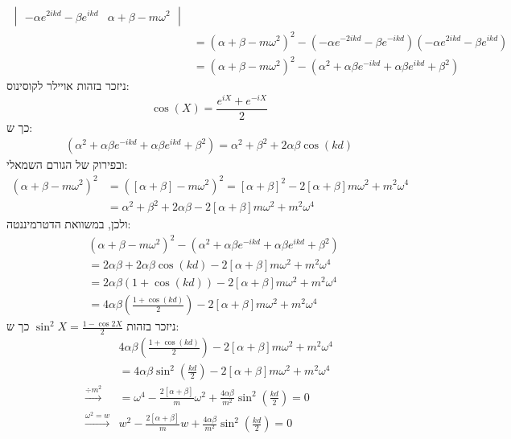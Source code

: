 \documentclass{article}
\begin{document}
\begin{Answer}
\begin{align*}
\begin{vmatrix}
        -\alpha e^{2ikd}-\beta e^{ikd}&\alpha+\beta-m\omega^2 
    \end{vmatrix}\\
    &=\left( \alpha+\beta-m\omega^2 \right)^{2}-\left( -\alpha e^{-2ikd}-\beta e^{-ikd} \right)\left( -\alpha e^{2ikd}-\beta e^{ikd} \right)\\
    &= \left( \alpha+\beta-m\omega^2 \right)^{2} - \left( \alpha^2+\alpha\beta e^{-ikd} +\alpha\beta e^{ikd} +\beta^2\right)
\end{align*}
ניזכר בזהות אויילר לקוסינוס:
$$\cos(X)=\frac{e^{iX}+e^{-iX}}{2}$$
כך ש:
\begin{align*}
    \left( \alpha^2+\alpha\beta e^{-ikd} +\alpha\beta e^{ikd} +\beta^2\right)=\alpha^{2}+\beta^{2}+2\alpha\beta\cos(kd)
\end{align*}
ובפירוק של הגורם השמאלי:
\begin{align*}
    \left( \alpha+\beta-m\omega^2 \right)^{2}&= \left( \left[ \alpha+\beta \right]-m\omega^2 \right)^{2}=\left[ \alpha+\beta \right]^{2}-2\left[ \alpha+\beta \right]m\omega^2+m^{2}\omega^{4}\\
    &=\alpha^{2}+\beta^{2}+2\alpha\beta-2\left[ \alpha+\beta \right]m\omega^2+m^{2}\omega^{4}
\end{align*}
ולכן, במשוואת הדטרמיננטה:
\begin{align*}
    &\left( \alpha+\beta-m\omega^2 \right)^{2} - \left( \alpha^2+\alpha\beta e^{-ikd} +\alpha\beta e^{ikd} +\beta^2\right)\\
    &=2\alpha\beta+2\alpha\beta\cos(kd)-2\left[ \alpha+\beta \right]m\omega^2+m^{2}\omega^{4}\\
    &=2\alpha\beta\left( 1+\cos(kd) \right)-2\left[ \alpha+\beta \right]m\omega^2+m^{2}\omega^{4}\\
    &=4\alpha\beta\left( \frac{1+\cos(kd)}{2} \right)-2\left[ \alpha+\beta \right]m\omega^2+m^{2}\omega^{4}
\end{align*}
ניזכר בזהות $\sin^{2}X=\frac{1-\cos2X}{2}$ כך ש:
\begin{align*}
    &4\alpha\beta\left( \frac{1+\cos(kd)}{2} \right)-2\left[ \alpha+\beta \right]m\omega^2+m^{2}\omega^{4}\\&=4\alpha\beta\sin^{2}\left( \frac{kd}{2} \right)-2\left[ \alpha+\beta \right]m\omega^2+m^{2}\omega^{4}\\
    \xrightarrow{\div m^{2}}&=\omega^{4}-\frac{2\left[ \alpha+\beta \right]}{m}\omega^{2}+\frac{4\alpha\beta}{m^2}\sin^{2}\left( \frac{kd}{2} \right)=0\\
    \xrightarrow{\omega^{2}=w}&w^{2}-\frac{2\left[ \alpha+\beta \right]}{m}w+\frac{4\alpha\beta}{m^2}\sin^{2}\left( \frac{kd}{2} \right)=0\\

\end{align*}
\end{Answer}
\end{document}
